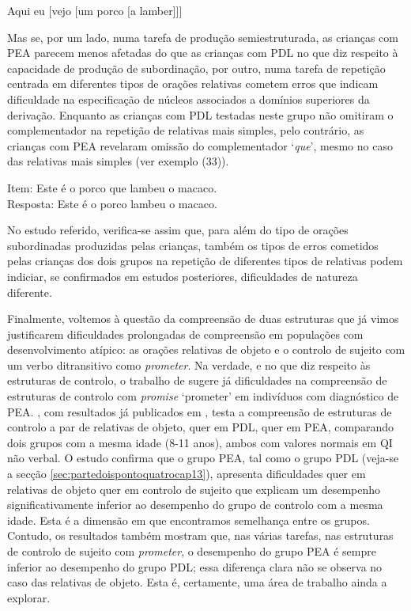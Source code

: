\documentclass[output=paper,colorlinks,citecolor=brown,booklanguage=portuguese]{langscibook}
\begin{document}
\ea
    \label{ex:13:32} Aqui eu [vejo [um porco [a lamber]]]
\z

Mas se, por um lado, numa tarefa de produção semiestruturada, as crianças com PEA parecem menos afetadas do que as crianças com PDL no que diz respeito à capacidade de produção de subordinação, por outro, numa tarefa de repetição centrada em diferentes tipos de orações relativas cometem erros que indicam dificuldade na especificação de núcleos associados a domínios superiores da derivação.  Enquanto as crianças com PDL testadas neste grupo não omitiram o complementador na repetição de relativas mais simples, pelo contrário, as crianças com PEA revelaram omissão do complementador ‘\emph{que}’, mesmo no caso das relativas mais simples (ver exemplo (33)). 

\ea
    \label{ex:13:33}	Item: Este é o porco que lambeu o macaco.\\
         Resposta: Este é o porco lambeu o macaco.
\z

No estudo referido, verifica-se assim que, para além do tipo de orações subordinadas produzidas pelas crianças, também os tipos de erros cometidos pelas crianças dos dois grupos na repetição de diferentes tipos de relativas podem indiciar, se confirmados em estudos posteriores, dificuldades de natureza diferente. 

Finalmente, voltemos à questão da compreensão de duas estruturas que já vimos justificarem dificuldades prolongadas de compreensão em populações com desenvolvimento atípico: as orações relativas de objeto e o controlo de sujeito com um verbo ditransitivo como \emph{prometer}. Na verdade, e no que diz respeito às estruturas de controlo, o trabalho de \citet{Janke2015} sugere já dificuldades na compreensão de estruturas de controlo com \emph{promise} ‘prometer’ em indivíduos com diagnóstico de PEA. \citet{Martinsempreparacao}, com resultados já publicados em \citet{Martins2018}, testa a compreensão de estruturas de controlo a par de relativas de objeto, quer em PDL, quer em PEA, comparando dois grupos com a mesma idade (8-11 anos), ambos com valores normais em QI não verbal. O estudo confirma que o grupo PEA, tal como o grupo PDL (veja-se a secção \ref{sec:partedoispontoquatrocap13}), apresenta dificuldades quer em relativas de objeto quer em controlo de sujeito que explicam um desempenho significativamente inferior ao desempenho do grupo de controlo com a mesma idade. Esta é a dimensão em que encontramos semelhança entre os grupos. Contudo, os resultados também mostram que, nas várias tarefas, nas estruturas de controlo de sujeito com \emph{prometer}, o desempenho do grupo PEA é sempre inferior ao desempenho do grupo PDL; essa diferença clara não se observa no caso das relativas de objeto. Esta é, certamente, uma área de trabalho ainda a explorar. 
\end{document}
